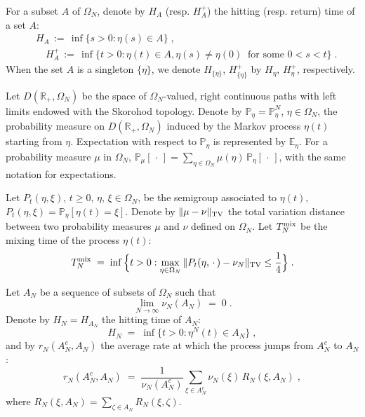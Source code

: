 \documentclass[reqno]{amsart}
\begin{document}
For a subset $A$ of $\Omega_N$, denote by $H_A$ (resp. $H^+_A$) the
hitting (resp. return) time of a set $A$:
\begin{equation*}
\begin{split}
& H_A \,:=\, \inf \big\{ s > 0 : \eta (s) \in A \big\}\;, \\
& \quad H^+_A \,:=\, \inf \{ t>0 : \eta (t) \in A, \eta(s) \not= \eta(0)
\;\;\textrm{for some $0< s < t$}\}\;.
\end{split}
\end{equation*}
When the set $A$ is a singleton $\{\eta\}$, we denote $H_{\{\eta\}}$,
$H^+_{\{\eta\}}$ by $H_\eta$, $H^+_{\eta}$, respectively.

Let $D({{\mathbb R}}_+, \Omega_N)$ be the space of $\Omega_N$-valued, right
continuous paths with left limits endowed with the Skorohod topology.
Denote by ${{\mathbb P}}_\eta = {{\mathbb P}}^N_\eta$, $\eta\in\Omega_N$, the
probability measure on $D({{\mathbb R}}_+, \Omega_N)$ induced by the Markov
process $\eta(t)$ starting from $\eta$. Expectation with respect to
${{\mathbb P}}_\eta$ is represented by ${{\mathbb E}}_\eta$. For a probability measure
$\mu$ in $\Omega_N$, ${{\mathbb P}}_\mu[\,\cdot\,] = \sum_{\eta\in\Omega_N}
\mu(\eta) \, {{\mathbb P}}_\eta [\,\cdot\,]$, with the same notation for
expectations.

Let $P_t (\eta,\xi)$, $t\ge 0$, $\eta$, $\xi\in\Omega_N$, be the
semigroup associated to $\eta(t)$, $P_t (\eta,\xi) = {{\mathbb P}}_\eta [
\eta(t)=\xi]$. Denote by $\Vert\mu -\nu\Vert_{\rm TV}$ the total
variation distance between two probability measures $\mu$ and $\nu$
defined on $\Omega_N$. Let $T^{\rm mix}_N$ be the mixing time of the
process $\eta(t)$:
\begin{equation*}
T^{\rm mix}_N \;=\; \inf\Big\{t>0 : \max_{\eta\in\Omega_N} \Vert
P_t(\eta, \,\cdot\,) - \nu_N \Vert_{\rm TV} \le \frac 14 \Big\}\;.
\end{equation*}

Let $A_N$ be a sequence of subsets of $\Omega_N$ such that
\begin{equation}
\label{05}
\lim_{N\to\infty} \nu_N(A_N) \;=\; 0\;.
\end{equation}
Denote by $H_N = H_{A_N}$ the hitting time of $A_N$:
\begin{equation*}
H_N \;=\; \inf\{t>0: \eta^N(t)\in A_N\}\;,
\end{equation*}
and by $r_N(A_N^c, A_N)$ the average rate at which the process jumps
from $A_N^c $ to $A_N$:
\begin{equation*}
r_N(A_N^c, A_N) \;=\; \frac 1{\nu_N (A_N^c)} 
\sum_{\xi \in A_N^c} \nu_N (\xi)\, R_N(\xi, A_N)\;,
\end{equation*}
where $R_N(\xi, A_N) = \sum_{\zeta\in A_N} R_N(\xi, \zeta)$.
\end{document}
